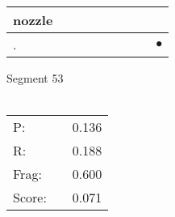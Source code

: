 \documentclass[landscape]{article}
\newcommand{\ssp}{\hspace{2pt}}
\newcommand{\mex}{\cellcolor{g}$\bullet$}
\begin{document}
\begin{tabular}{|l|p{10pt}|p{10pt}|p{10pt}|p{10pt}|p{10pt}|p{10pt}|p{10pt}|p{10pt}|}
\hline
\ssp nozzle \ssp&\hspace{2pt}&\hspace{2pt}&\hspace{2pt}&\hspace{2pt}&\hspace{2pt}&\hspace{2pt}&\hspace{2pt}&\hspace{2pt}\\
\hline
\ssp \cellcolor{ref7}. \ssp&\hspace{2pt}&\hspace{2pt}&\hspace{2pt}&\hspace{2pt}&\hspace{2pt}&\hspace{2pt}&\hspace{2pt}&\hspace{2pt}\mex\\
\hline
\end{tabular}

\vspace{6pt}
\noindent Segment 53\\\\
\noindent\begin{tabular}{lm{12pt}r}
\hline
P:&&0.136\\
R:&&0.188\\
Frag:&&0.600\\
Score:&&0.071\\
\end{tabular}

\newpage
\end{document}
